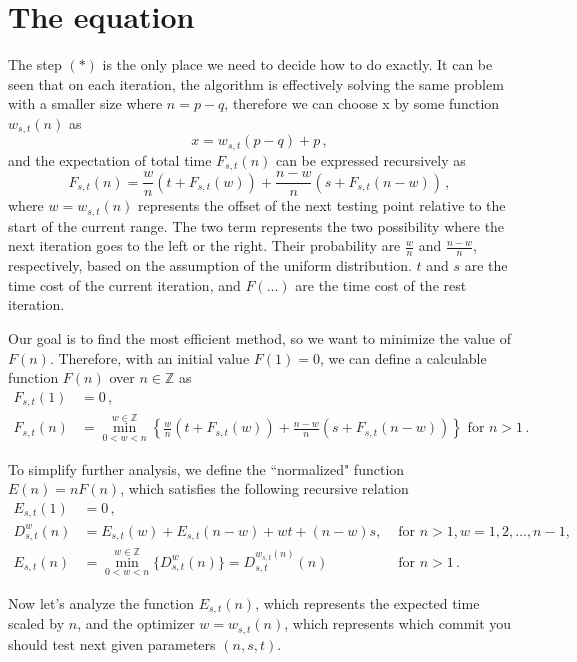 \documentclass[]{article}
\begin{document}
\section{The equation}
 
The step $(*)$ is the only place we need to decide how to do exactly. It can be seen that on each iteration, the algorithm is effectively solving the same problem with a smaller size where $n = p - q$, therefore we can choose x by some function $w_{s,t}(n)$ as
\[
x = w_{s,t}(p - q) + p \,,
\]
and the expectation of total time $F_{s,t}(n)$ can be expressed recursively as
\begin{equation}
F_{s,t}(n) = \frac{w}{n}(t + F_{s,t}(w)) + \frac{n-w}{n}(s + F_{s,t}(n-w))\,,
\end{equation}
where $w = w_{s,t}(n)$ represents the offset of the next testing point relative to the start of the current range. The two term represents the two possibility where the next iteration goes to the left or the right. Their probability are $\frac{w}{n}$ and $\frac{n-w}{n}$, respectively, based on the assumption of the uniform distribution. $t$ and $s$ are the time cost of the current iteration, and $F(...)$ are the time cost of the rest iteration.

Our goal is to find the most efficient method, so we want to minimize the value of $F(n)$. Therefore, with an initial value $F(1) = 0$, we can define a calculable function $F(n)$ over $n \in \mathbb{Z}$ as
\begin{align*}
F_{s,t}(1) &= 0\,,\\
F_{s,t}(n) &= \min_{0<w<n}^{w\in\mathbb{Z}}\left\{\frac{w}{n}(t + F_{s,t}(w)) + \frac{n-w}{n}(s + F_{s,t}(n-w))\right\} \textrm{ for } n > 1 \,.
\end{align*}

To simplify further analysis, we define the ``normalized" function $E(n) = nF(n)$, which satisfies the following recursive relation
\begin{align*}
E_{s,t}(1) &= 0\,,\\
D^{w}_{s,t}(n) &= E_{s,t}(w) + E_{s,t}(n-w) + wt +(n-w)s,&\textrm{ for } n > 1, w=1,2,\dots,n-1, \\
E_{s,t}(n) &= \min_{0<w<n}^{w\in\mathbb{Z}}\{D^{w}_{s,t}(n)\} = D^{w_{s,t}(n)}_{s,t}(n) &\textrm{ for } n > 1 \,.
\end{align*}

Now let's analyze the function $E_{s,t}(n)$, which represents the expected time scaled by $n$, and the optimizer $w = w_{s,t}(n)$, which represents which commit you should test next given parameters $(n,s,t)$.
\end{document}
